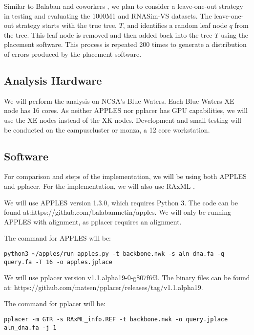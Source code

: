 \documentclass[10pt]{article}
\begin{document}
Similar to Balaban and coworkers \cite{balaban_apples_2020}, we plan to consider a
leave-one-out strategy in testing and evaluating the 1000M1 and
RNASim-VS datasets. The leave-one-out strategy starts with the true
tree, \(T\), and identifies a random leaf node \(q\) from the tree. This
leaf node is removed and then added back into the tree \(T\) using the
placement software. This process is repeated 200 times to generate a
distribution of errors produced by the placement software.

\subsection{Analysis Hardware}

We will perform the analysis on NCSA's Blue Waters. Each Blue Waters XE
node has 16 cores. As neither APPLES nor pplacer has GPU capabilities,
we will use the XE nodes instead of the XK nodes. Development and small
testing will be conducted on the campuscluster or monza, a 12 core
workstation.

\subsection{Software}

For comparison and steps of the implementation, we will be using both
APPLES and pplacer. For the implementation, we will also use RAxML
\cite{raxml}.

We will use APPLES version 1.3.0, which requires Python 3. The code can
be found at:\newline https://github.com/balabanmetin/apples. We will
only be running APPLES with alignment, as pplacer requires an alignment.

The command for APPLES will be:

\begin{verbatim}
python3 ~/apples/run_apples.py -t backbone.nwk -s aln_dna.fa -q query.fa -T 16 -o apples.jplace
\end{verbatim}

We will use pplacer version v1.1.alpha19-0-g807f6f3. The binary files
can be found at:\newline
https://github.com/matsen/pplacer/releases/tag/v1.1.alpha19.

The command for pplacer will be:

\begin{verbatim}
pplacer -m GTR -s RAxML_info.REF -t backbone.nwk -o query.jplace aln_dna.fa -j 1
\end{verbatim}
\end{document}
